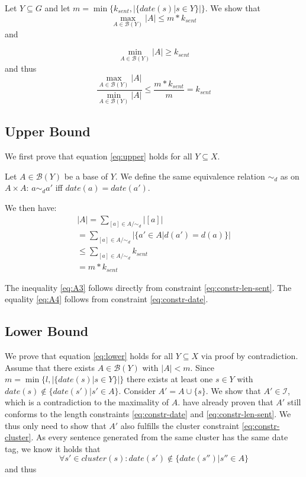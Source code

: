 \documentclass[a4paper,BCOR=10mm]{report}
\numberwithin{lemma}{chapter}
\numberwithin{definition}{chapter}
\begin{document}
\begin{appendices}
Let $Y \subseteq G$ and let $m = \min \{ k_{sent}, |\{\mathit{date}(s) | s \in Y\}| \}$.
We show that 
\begin{equation}
\max_{A \in \mathcal{B}(Y)} |A| \leq m * k_{sent} \label{eq:upper}
\end{equation}
 and

\begin{equation}
\min_{A \in \mathcal{B}(Y)} |A| \geq k_{sent} \label{eq:lower}
\end{equation}
and thus 
\begin{equation}
\frac{\max_{A \in \mathcal{B}(Y)} |A|}{\min_{A \in \mathcal{B}(Y)} |A|}
\leq \frac{m * k_{sent}}{m} = k_{sent}    
\end{equation}

\subsection{Upper Bound}

We first prove that equation \ref{eq:upper} holds for all $Y \subseteq X$.

Let $A \in \mathcal{B}(Y)$ be a base of $Y$. We define the same equivalence relation $\sim_d$ as \citeauthor{markert} on $A \times A$:
$a \sim_d a'$ iff $\mathit{date}(a) = \mathit{date}(a')$.

We then have:
\begin{align}
|A| = \sum_{[a] \in A/\sim_d} |[a]| \\
    = \sum_{[a] \in A/\sim_d} |\{ a' \in A | d(a') = d(a) \}| \label{eq:A2} \\
    \leq \sum_{[a] \in A/\sim_d} k_{sent} \label{eq:A3} \\
    = m * k_{sent} \label{eq:A4}
\end{align}

The inequality \ref{eq:A3} follows directly from constraint \ref{eq:constr-len-sent}.
The equality \ref{eq:A4} follows from constraint \ref{eq:constr-date}.


\subsection{Lower Bound} \label{sec:proof-date-lower}

We prove that equation \ref{eq:lower} holds for all $Y \subseteq X$ via proof by contradiction.
Assume that there exists $A \in \mathcal{B}(Y)$ with $|A| < m$.
Since $m = \min \{ l, |\{\mathit{date}(s) | s \in Y\}| \}$ there exists at least one $s \in Y$ with $\mathit{date}(s) \not\in \{\mathit{date}(s') | s' \in A\}$.
Consider $A' = A \cup \{ s \}$. We show that $A' \in \mathcal{I}$, which is a contradiction to the maximality of $A$. \citet{markert} have already proven that $A'$ still conforms to the length constraints \ref{eq:constr-date} and \ref{eq:constr-len-sent}.
We thus only need to show that $A'$ also fulfills the cluster constraint \ref{eq:constr-cluster}.
As every sentence generated from the same cluster has the same date tag, we know it holds that
\begin{equation}
\forall s' \in \mathit{cluster}(s): \mathit{date}(s') \not\in \{\mathit{date}(s'') | s'' \in A \}
\end{equation}
and thus


\end{appendices}
\end{document}
